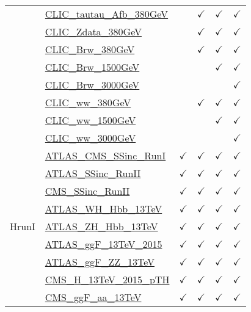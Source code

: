 \documentclass{article}
\begin{document}
\begin{longtable}{|c|l|c|c|c|c|}
 & \href{https://arxiv.org}{CLIC_tautau_Afb_380GeV}  &  & $\checkmark$ & $\checkmark$ & $\checkmark$\\ \cline{2-6}
 & \href{https://arxiv.org}{CLIC_Zdata_380GeV}  &  & $\checkmark$ & $\checkmark$ & $\checkmark$\\ \cline{2-6}
 & \href{https://arxiv.org}{CLIC_Brw_380GeV}  &  & $\checkmark$ & $\checkmark$ & $\checkmark$\\ \cline{2-6}
 & \href{https://arxiv.org}{CLIC_Brw_1500GeV}  &  &  & $\checkmark$ & $\checkmark$\\ \cline{2-6}
 & \href{https://arxiv.org}{CLIC_Brw_3000GeV}  &  &  &  & $\checkmark$\\ \cline{2-6}
 & \href{https://arxiv.org}{CLIC_ww_380GeV}  &  & $\checkmark$ & $\checkmark$ & $\checkmark$\\ \cline{2-6}
 & \href{https://arxiv.org}{CLIC_ww_1500GeV}  &  &  & $\checkmark$ & $\checkmark$\\ \cline{2-6}
 & \href{https://arxiv.org}{CLIC_ww_3000GeV}  &  &  &  & $\checkmark$
\\ \hline
\multirow{10}{*}{HrunI}
 & \href{https://arxiv.org}{ATLAS_CMS_SSinc_RunI}  & $\checkmark$ & $\checkmark$ & $\checkmark$ & $\checkmark$\\ \cline{2-6}
 & \href{https://arxiv.org}{ATLAS_SSinc_RunII}  & $\checkmark$ & $\checkmark$ & $\checkmark$ & $\checkmark$\\ \cline{2-6}
 & \href{https://arxiv.org}{CMS_SSinc_RunII}  & $\checkmark$ & $\checkmark$ & $\checkmark$ & $\checkmark$\\ \cline{2-6}
 & \href{https://arxiv.org}{ATLAS_WH_Hbb_13TeV}  & $\checkmark$ & $\checkmark$ & $\checkmark$ & $\checkmark$\\ \cline{2-6}
 & \href{https://arxiv.org}{ATLAS_ZH_Hbb_13TeV}  & $\checkmark$ & $\checkmark$ & $\checkmark$ & $\checkmark$\\ \cline{2-6}
 & \href{https://arxiv.org}{ATLAS_ggF_13TeV_2015}  & $\checkmark$ & $\checkmark$ & $\checkmark$ & $\checkmark$\\ \cline{2-6}
 & \href{https://arxiv.org}{ATLAS_ggF_ZZ_13TeV}  & $\checkmark$ & $\checkmark$ & $\checkmark$ & $\checkmark$\\ \cline{2-6}
 & \href{https://arxiv.org}{CMS_H_13TeV_2015_pTH}  & $\checkmark$ & $\checkmark$ & $\checkmark$ & $\checkmark$\\ \cline{2-6}
 & \href{https://arxiv.org}{CMS_ggF_aa_13TeV}  & $\checkmark$ & $\checkmark$ & $\checkmark$ & $\checkmark$\\ \cline{2-6}

\end{longtable}
\end{document}
